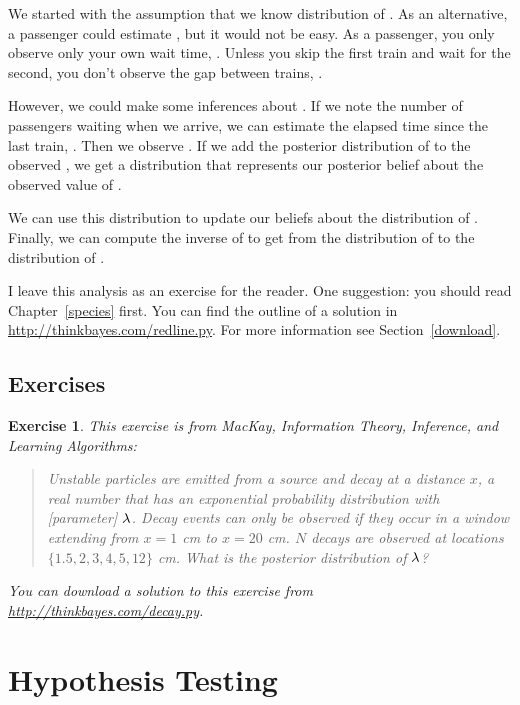 \documentclass[12pt]{book}
\theoremstyle{exercise}
\newtheorem{exercise}{Exercise}[chapter]
\begin{document}
We started with the assumption that we know
distribution of .
As an alternative, a passenger could estimate , but it would
not be easy.
As a passenger, you only
observe only your own wait time, .  Unless you skip
the first train and wait for the second, you don't
observe the gap between trains, .

However, we could make some inferences about .  If we note
the number of passengers waiting when we arrive, we can estimate
the elapsed time since the last train, .  Then we observe
.  If we add the posterior distribution of  to
the observed , we get a distribution that represents
our posterior belief about the observed value of .

We can use this distribution to update our beliefs about the
distribution of .  Finally, we can compute the
inverse of  to get from the distribution of 
to the distribution of .

I leave this analysis as an exercise for the
reader.  One suggestion: you should read Chapter~\ref{species} first.
You can find the outline of
a solution in \url{http://thinkbayes.com/redline.py}.
  For more information
see Section~\ref{download}.

\section{Exercises}

\begin{exercise}
This exercise is from
MacKay, {\em Information Theory, Inference, and Learning Algorithms}:

\begin{quote}
    Unstable particles are emitted from a source and decay at a
distance $x$, a real number that has an exponential probability
distribution with [parameter] $\mathtt{\lambda}$.  Decay events can only be
observed if they occur in a window extending from $x=1$ cm to $x=20$
cm.  $N$ decays are observed at locations $\{ 1.5, 2, 3, 4, 5, 12 \}$
cm.  What is the posterior distribution of $\mathtt{\lambda}$?

\end{quote}

You can download a solution to this exercise from
\url{http://thinkbayes.com/decay.py}.

\end{exercise}



\chapter{Hypothesis Testing}
\label{hypotest}
\end{document}
